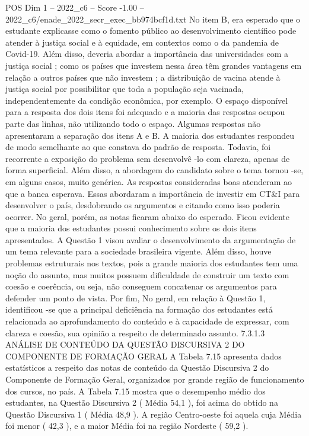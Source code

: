 \begin{textsample}{POS Dim 1 – 2022\_c6 – Score -1.00 – 2022\_c6/enade\_2022\_secr\_exec\_bb974bcf1d.txt}
No item B, era esperado que o estudante explicasse como o fomento público ao desenvolvimento científico pode atender à justiça social e à equidade, em contextos como o da pandemia de Covid-19.
Além disso, deveria abordar a importância das universidades com a justiça social ; como os países que investem nessa área têm grandes vantagens em relação a outros países que não investem ; a distribuição de vacina atende à justiça social por possibilitar que toda a população seja vacinada, independentemente da condição econômica, por exemplo.
O espaço disponível para a resposta dos dois itens foi adequado e a maioria das respostas ocupou parte das linhas, não utilizando todo o espaço.
Algumas respostas não apresentaram a separação dos itens A e B.
A maioria dos estudantes respondeu de modo semelhante ao que constava do padrão de resposta.
Todavia, foi recorrente a exposição do problema sem desenvolvê -lo com clareza, apenas de forma superficial.
Além disso, a abordagem do candidato sobre o tema tornou -se, em alguns casos, muito genérica.
As respostas consideradas boas atenderam ao que a banca esperava.
Essas abordaram a importância de investir em CT\&I para desenvolver o país, desdobrando os argumentos e citando como isso poderia ocorrer.
No geral, porém, as notas ficaram abaixo do esperado.
Ficou evidente que a maioria dos estudantes possui conhecimento sobre os dois itens apresentados.
A Questão 1 visou avaliar o desenvolvimento da argumentação de um tema relevante para a sociedade brasileira vigente.
Além disso, houve problemas estruturais nos textos, pois a grande maioria dos estudantes tem uma noção do assunto, mas muitos possuem dificuldade de construir um texto com coesão e coerência, ou seja, não conseguem concatenar os argumentos para defender um ponto de vista.
Por fim, No geral, em relação à Questão 1, identificou -se que a principal deficiência na formação dos estudantes está relacionada ao aprofundamento do conteúdo e à capacidade de expressar, com clareza e coesão, sua opinião a respeito de determinado assunto. 7.3.1.3 ANÁLISE DE CONTEÚDO DA QUESTÃO DISCURSIVA 2 DO COMPONENTE DE FORMAÇÃO GERAL A Tabela 7.15 apresenta dados estatísticos a respeito das notas de conteúdo da Questão Discursiva 2 do Componente de Formação Geral, organizados por grande região de funcionamento dos cursos, no país.
A Tabela 7.15 mostra que o desempenho médio dos estudantes, na Questão Discursiva 2 ( Média 54,1 ), foi acima do obtido na Questão Discursiva 1 ( Média 48,9 ).
A região Centro-oeste foi aquela cuja Média foi menor ( 42,3 ), e a maior Média foi na região Nordeste ( 59,2 ).

\end{textsample}
